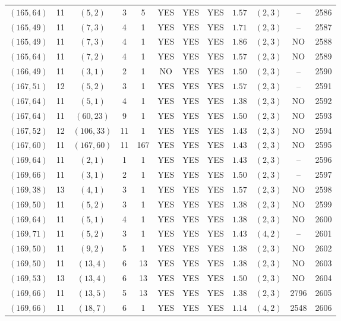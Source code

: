 \begin{longtable}{|c|c|c|c|c|c|c|c|c|c|c|c|}
$(165,64)$ & 11 & $(5,2)$ & 3 & 5 & YES & YES & YES & $1.57$ & $(2,3)$ & -- & 2586\\
$(165,49)$ & 11 & $(7,3)$ & 4 & 1 & YES & YES & YES & $1.71$ & $(2,3)$ & -- & 2587\\
$(165,49)$ & 11 & $(7,3)$ & 4 & 1 & YES & YES & YES & $1.86$ & $(2,3)$ & NO & 2588\\
$(165,64)$ & 11 & $(7,2)$ & 4 & 1 & YES & YES & YES & $1.57$ & $(2,3)$ & NO & 2589\\
$(166,49)$ & 11 & $(3,1)$ & 2 & 1 & NO & YES & YES & $1.50$ & $(2,3)$ & -- & 2590\\
$(167,51)$ & 12 & $(5,2)$ & 3 & 1 & YES & YES & YES & $1.57$ & $(2,3)$ & -- & 2591\\
$(167,64)$ & 11 & $(5,1)$ & 4 & 1 & YES & YES & YES & $1.38$ & $(2,3)$ & NO & 2592\\
$(167,64)$ & 11 & $(60,23)$ & 9 & 1 & YES & YES & YES & $1.50$ & $(2,3)$ & NO & 2593\\
$(167,52)$ & 12 & $(106,33)$ & 11 & 1 & YES & YES & YES & $1.43$ & $(2,3)$ & NO & 2594\\
$(167,60)$ & 11 & $(167,60)$ & 11 & 167 & YES & YES & YES & $1.43$ & $(2,3)$ & NO & 2595\\
$(169,64)$ & 11 & $(2,1)$ & 1 & 1 & YES & YES & YES & $1.43$ & $(2,3)$ & -- & 2596\\
$(169,66)$ & 11 & $(3,1)$ & 2 & 1 & YES & YES & YES & $1.50$ & $(2,3)$ & -- & 2597\\
$(169,38)$ & 13 & $(4,1)$ & 3 & 1 & YES & YES & YES & $1.57$ & $(2,3)$ & NO & 2598\\
$(169,50)$ & 11 & $(5,2)$ & 3 & 1 & YES & YES & YES & $1.38$ & $(2,3)$ & NO & 2599\\
$(169,64)$ & 11 & $(5,1)$ & 4 & 1 & YES & YES & YES & $1.38$ & $(2,3)$ & NO & 2600\\
$(169,71)$ & 11 & $(5,2)$ & 3 & 1 & YES & YES & YES & $1.43$ & $(4,2)$ & -- & 2601\\
$(169,50)$ & 11 & $(9,2)$ & 5 & 1 & YES & YES & YES & $1.38$ & $(2,3)$ & NO & 2602\\
$(169,50)$ & 11 & $(13,4)$ & 6 & 13 & YES & YES & YES & $1.38$ & $(2,3)$ & NO & 2603\\
$(169,53)$ & 13 & $(13,4)$ & 6 & 13 & YES & YES & YES & $1.50$ & $(2,3)$ & NO & 2604\\
$(169,66)$ & 11 & $(13,5)$ & 5 & 13 & YES & YES & YES & $1.38$ & $(2,3)$ & 2796 & 2605\\
$(169,66)$ & 11 & $(18,7)$ & 6 & 1 & YES & YES & YES & $1.14$ & $(4,2)$ & 2548 & 2606\\

\end{longtable}
